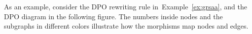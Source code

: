 As an example, consider the DPO rewriting rule in~Example~\ref{ex:grsaa}, and the DPO diagram in the following figure. The numbers inside nodes and the subgraphs in different colors illustrate how the morphisms map nodes and edges. 
